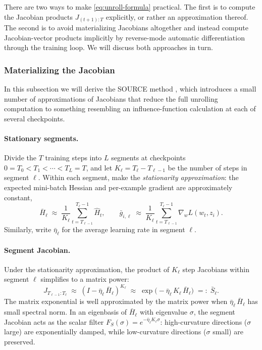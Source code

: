 \documentclass[11pt]{article}
\begin{document}
There are two ways to make \eqref{eq:unroll-formula} practical. The first is to compute the Jacobian products $J_{(t+1):T}$ explicitly, or rather an approximation thereof. The second is to avoid materializing Jacobians altogether and instead compute Jacobian-vector products implicitly by reverse-mode automatic differentiation through the training loop. We will discuss both approaches in turn.

\subsubsection{Materializing the Jacobian}\label{subsec:explicit-unroll}

In this subsection we will derive the SOURCE method \citep{bae2024source}, which introduces a small number of approximations of Jacobians that reduce the full unrolling computation to something resembling an influence-function calculation at each of several checkpoints.

\paragraph{Stationary segments.} Divide the $T$ training steps into $L$ segments at checkpoints $0 = T_0 < T_1 < \cdots < T_L = T$, and let $K_\ell = T_\ell - T_{\ell-1}$ be the number of steps in segment $\ell$. Within each segment, make the \emph{stationarity approximation}: the expected mini-batch Hessian and per-example gradient are approximately constant,
\begin{equation}\label{eq:stationary-approx}
  \bar{H}_\ell \;\approx\; \frac{1}{K_\ell}\sum_{t=T_{\ell-1}}^{T_\ell - 1}\widehat{H}_t, \qquad \bar{g}_{i,\ell} \;\approx\; \frac{1}{K_\ell}\sum_{t=T_{\ell-1}}^{T_\ell - 1}\nabla_w L(w_t,z_i).
\end{equation}
Similarly, write $\bar\eta_\ell$ for the average learning rate in segment $\ell$.

\paragraph{Segment Jacobian.} Under the stationarity approximation, the product of $K_\ell$ step Jacobians within segment $\ell$ simplifies to a matrix power:
\begin{equation}\label{eq:segment-jacobian}
  J_{T_{\ell-1}:T_\ell} \;\approx\; (I - \bar\eta_\ell\,\bar{H}_\ell)^{K_\ell} \;\approx\; \exp\bigl(-\bar\eta_\ell\,K_\ell\,\bar{H}_\ell\bigr) \;=:\; \bar{S}_\ell.
\end{equation}
The matrix exponential is well approximated by the matrix power when $\bar\eta_\ell\,\bar{H}_\ell$ has small spectral norm. In an eigenbasis of $\bar{H}_\ell$ with eigenvalue $\sigma$, the segment Jacobian acts as the scalar filter $F_S(\sigma) = e^{-\bar\eta_\ell K_\ell \sigma}$: high-curvature directions ($\sigma$ large) are exponentially damped, while low-curvature directions ($\sigma$ small) are preserved.
\end{document}
